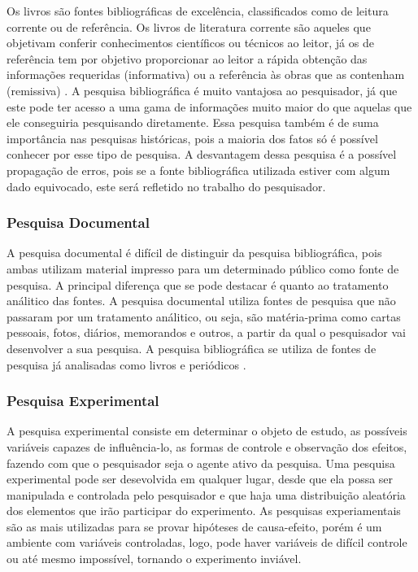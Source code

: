 	Os livros são fontes bibliográficas de excelência, classificados como de leitura corrente ou de referência. Os livros de literatura corrente são aqueles que objetivam conferir conhecimentos científicos ou técnicos ao leitor, já os de referência tem por objetivo proporcionar ao leitor a rápida obtenção das informações requeridas (informativa) ou a referência às obras que as contenham (remissiva) \cite{ac2002elaborar}.  
A pesquisa bibliográfica é muito vantajosa ao pesquisador, já que este pode ter acesso a uma gama de informações muito maior do que aquelas que ele conseguiria pesquisando diretamente. Essa pesquisa também é de suma importância nas pesquisas históricas, pois a maioria dos fatos só é possível conhecer por esse tipo de pesquisa.
A desvantagem dessa pesquisa é a possível propagação de erros, pois se a fonte bibliográfica utilizada estiver com algum dado equivocado, este será refletido no trabalho do pesquisador.	
\subsubsection{Pesquisa Documental}
	A pesquisa documental é difícil de distinguir da pesquisa bibliográfica, pois ambas utilizam material impresso para um determinado público como fonte de pesquisa. A principal diferença que se pode destacar é quanto ao tratamento análitico das fontes. A pesquisa documental utiliza fontes de pesquisa que não passaram por um tratamento análitico, ou seja, são matéria-prima como cartas pessoais, fotos, diários, memorandos e outros, a partir da qual o pesquisador vai desenvolver a sua pesquisa. A pesquisa bibliográfica se utiliza de fontes de pesquisa já analisadas como livros e periódicos \cite{ac2002elaborar}.
\subsubsection{Pesquisa Experimental}
	A pesquisa experimental consiste em determinar o objeto de estudo, as possíveis variáveis capazes de influência-lo, as formas de controle e observação dos efeitos, fazendo com que o pesquisador seja o agente ativo da pesquisa. Uma pesquisa experimental pode ser desevolvida em qualquer lugar, desde que ela possa ser manipulada e controlada pelo pesquisador e que haja uma distribuição aleatória dos elementos que irão participar do experimento. As pesquisas experiamentais são as mais utilizadas para se provar hipóteses de causa-efeito, porém é um ambiente com variáveis controladas, logo, pode haver variáveis de difícil controle ou até mesmo impossível, tornando o experimento inviável. \cite{ac2002elaborar}
